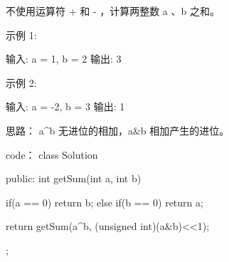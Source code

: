 不使用运算符 + 和 - ​​​​​​​，计算两整数 ​​​​​​​a 、b ​​​​​​​之和。

示例 1:

输入: a = 1, b = 2
输出: 3

示例 2:

输入: a = -2, b = 3
输出: 1


























思路：
a^b 无进位的相加，a&b 相加产生的进位。

























code：
class Solution {
public:
    int getSum(int a, int b) {
        if(a == 0)
            return b;
        else if(b == 0)
            return a;
        
        return getSum(a^b, (unsigned int)(a&b)<<1);
    }
};